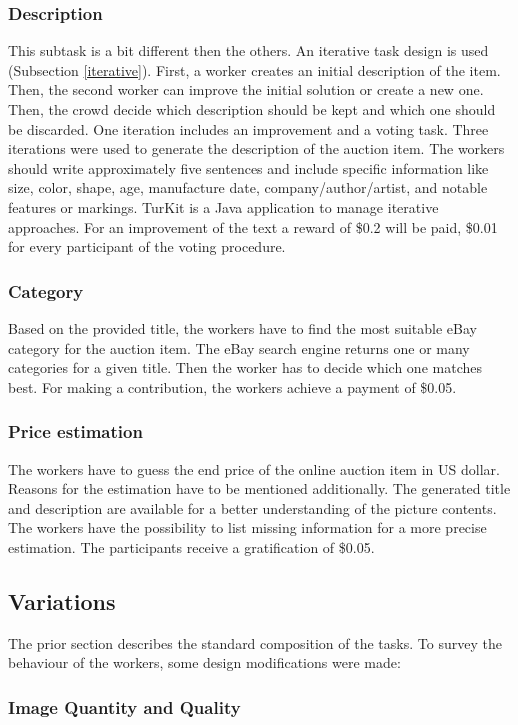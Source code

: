 \subsubsection{Description}
This subtask is a bit different then the others. An iterative task design is used (Subsection \ref{iterative}). First, a worker creates an initial description of the item. Then, the second worker can improve the initial solution or create a new one. Then, the crowd decide which description should be kept and which one should be discarded. One iteration includes an improvement and a voting task. Three iterations were used to generate the description of the auction item. The workers should write approximately five sentences and include specific information like size, color, shape, age, manufacture date, company/author/artist, and notable features or markings. TurKit is a Java application to manage iterative approaches. For an improvement of the text a reward of \$0.2 will be paid, \$0.01 for every participant of the voting procedure.
\subsubsection{Category}
Based on the provided title, the workers have to find the most suitable eBay category for the auction item. The eBay search engine returns one or many categories for a given title. Then the worker has to decide which one matches best. For making a contribution, the workers achieve a payment of \$0.05.
\subsubsection{Price estimation}
The workers have to guess the end price of the online auction item in US dollar. Reasons for the estimation have to be mentioned additionally. The generated title and description are available for a better understanding of the picture contents. The workers have the possibility to list missing information for a more precise estimation. The participants receive a gratification of \$0.05.

\subsection{Variations}
The prior section describes the standard composition of the tasks. To survey the behaviour of the workers, some design modifications were made: 
\subsubsection{Image Quantity and Quality}

